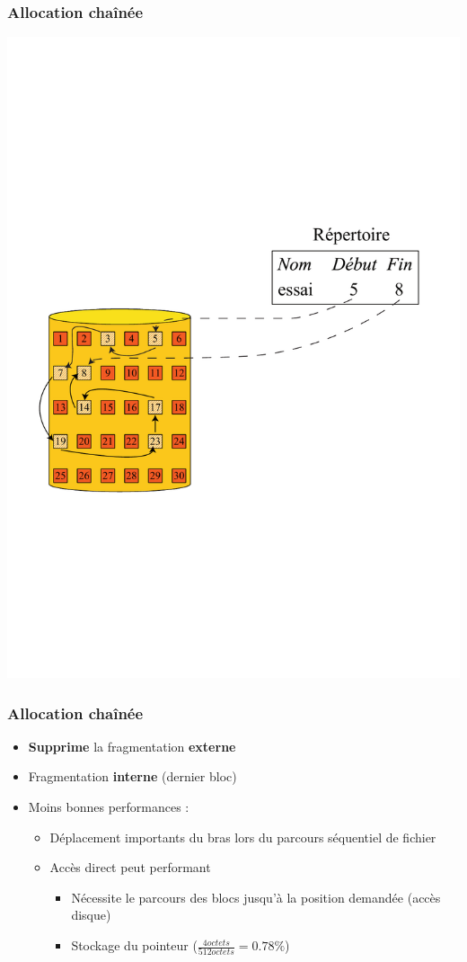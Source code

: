 \begin{frame}
\frametitle{Allocation chaînée}
\includegraphics[width=.8\textwidth]{../illustration/allocation_chainee.pdf}
\end{frame}

\begin{frame}
\frametitle{Allocation chaînée}
\begin{itemize}
\item \textbf{Supprime} la fragmentation \textbf{externe}
\item Fragmentation \textbf{interne} (dernier bloc)
\item Moins bonnes performances :
\begin{itemize}
\item Déplacement importants du bras lors du parcours séquentiel de fichier
\item Accès direct peut performant
\begin{itemize}
\item Nécessite le parcours des blocs jusqu'à la position demandée (accès disque)
\item Stockage du pointeur ($\frac{4 octets}{512 octets} = 0.78\%$)
\end{itemize}
\end{itemize}
\end{itemize}
\end{frame}

